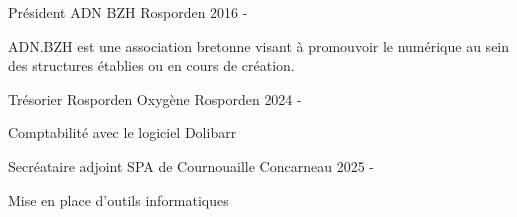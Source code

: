 

\begin{cventries}

  \cventry
    {Président} %
    {ADN BZH} %
    {Rosporden} %
    {2016 - } %
    {
      \begin{cvitems} %
        \item {ADN.BZH est une association bretonne visant à promouvoir le numérique au sein des structures établies ou en cours de création.}
      \end{cvitems}
    }

  \cventry
    {Trésorier} %
    {Rosporden Oxygène} %
    {Rosporden} %
    {2024 - } %
    {
      \begin{cvitems} %
        \item {Comptabilité avec le logiciel Dolibarr}
      \end{cvitems}
    }

  \cventry
    {Secréataire adjoint} %
    {SPA de Cournouaille} %
    {Concarneau} %
    {2025 - } %
    {
      \begin{cvitems} %
        \item {Mise en place d'outils informatiques}
      \end{cvitems}
    }


\end{cventries}
